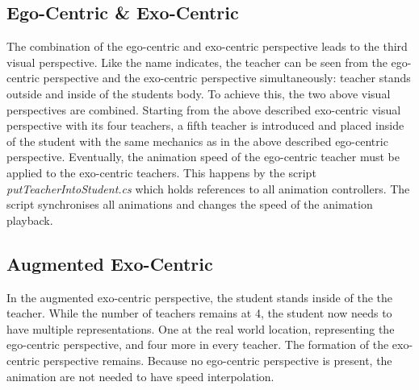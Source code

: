 \subsection{Ego-Centric \& Exo-Centric}
The combination of the ego-centric and exo-centric perspective leads to the third visual perspective. Like the name indicates, the teacher can be seen from the ego-centric perspective and the exo-centric perspective simultaneously: teacher stands outside and inside of the students body. To achieve this, the two above visual perspectives are combined. Starting from the above described exo-centric visual perspective with its four teachers, a fifth teacher is introduced and placed inside of the student with the same mechanics as in the above described ego-centric perspective. Eventually, the animation speed of the ego-centric teacher must be applied to the exo-centric teachers. This happens by the script \textit{putTeacherIntoStudent.cs} which holds references to all animation controllers. The script synchronises all animations and changes the speed of the animation playback.
\subsection{Augmented Exo-Centric}
In the augmented exo-centric perspective, the student stands inside of the the teacher. While the number of teachers remains at 4, the student now needs to have multiple representations. One at the real world location, representing the ego-centric perspective, and four more in every teacher. The formation of the exo-centric perspective remains. Because no ego-centric perspective is present, the animation are not needed to have speed interpolation.

